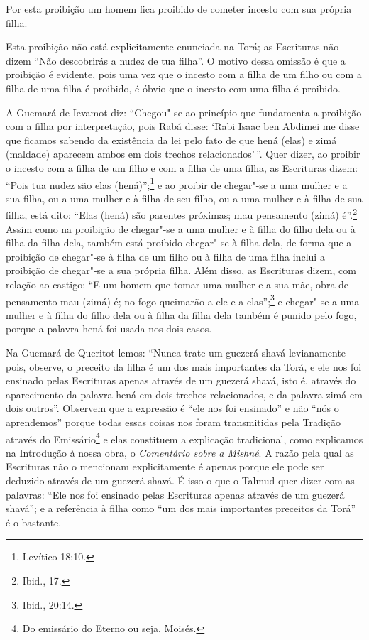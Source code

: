 \begin{multicols}{2}
Por esta proibição um homem fica proibido de cometer incesto com sua
própria filha.

Esta proibição não está explicitamente enunciada na Torá\starr; as
Escrituras não dizem ``Não descobrirás a nudez de tua filha''. O motivo
dessa omissão é que a proibição é evidente, pois uma vez que o incesto
com a filha de um filho ou com a filha de uma filha é proibido, é óbvio
que o incesto com uma filha é proibido.

A Guemará\starr{} de Ievamot\starr{} diz: ``Chegou"-se ao princípio que fundamenta a
proibição com a filha por interpretação, pois Rabá\starr{} disse: `Rabi Isaac
ben Abdimei\starr{} me disse que ficamos sabendo da existência da lei pelo fato
de que hená\starr{} (elas) e zimá\starr{} (maldade) aparecem ambos em dois
trechos relacionados'\,''. Quer dizer, ao proibir o incesto com a filha de
um filho e com a filha de uma filha, as Escrituras dizem: ``Pois tua
nudez são elas (hená\starr{})'';\footnote{Levítico 18:10.} e ao proibir de chegar"-se a
uma mulher e a sua filha, ou a uma mulher e à filha de seu filho, ou a
uma mulher e à filha de sua filha, está dito: ``Elas (hená\starr{}) são parentes
próximas; mau pensamento (zimá\starr) é''.\footnote{Ibid., 17.} Assim como na proibição
de chegar"-se a uma mulher e à filha do filho dela ou à filha da filha
dela, também está proibido chegar"-se à filha dela, de forma que a
proibição de chegar"-se à filha de um filho ou à filha de uma filha
inclui a proibição de chegar"-se a sua própria filha. Além disso, as
Escrituras dizem, com relação ao castigo: ``E um homem que tomar uma
mulher e a sua mãe, obra de pensamento mau (zimá\starr) é; no fogo queimarão a
ele e a elas'';\footnote{Ibid., 20:14.} e chegar"-se a uma mulher e à filha do
filho dela ou à filha da filha dela também é punido pelo fogo, porque a
palavra hená\starr{} foi usada nos dois casos.

Na Guemará\starr{} de Queritot\starr{} lemos: ``Nunca trate um guezerá shavá\starr{}
levianamente pois, observe, o preceito da filha é um dos mais
importantes da Torá\starr, e ele nos foi ensinado pelas Escrituras apenas
através de um guezerá shavá\starr, isto é, através do aparecimento da
palavra hená\starr{} em dois trechos relacionados, e da palavra zimá\starr{} em dois
outros''. Observem que a expressão é ``ele nos foi ensinado'' e não
``nós o aprendemos'' porque todas essas coisas nos foram transmitidas
pela Tradição através do Emissário\footnote{Do emissário do Eterno ou seja, Moisés.} e elas constituem a explicação tradicional, como explicamos na Introdução à
nossa obra, o \emph{Comentário sobre a Mishné}. A razão pela qual as
Escrituras não o mencionam explicitamente é apenas porque ele pode ser
deduzido através de um guezerá shavá\starr. É isso o que o Talmud\starr{} quer
dizer com as palavras: ``Ele nos foi ensinado pelas Escrituras apenas
através de um guezerá shavá\starr''; e a referência à filha como ``um dos
mais importantes preceitos da Torá\starr'' é o bastante.


\end{multicols}
